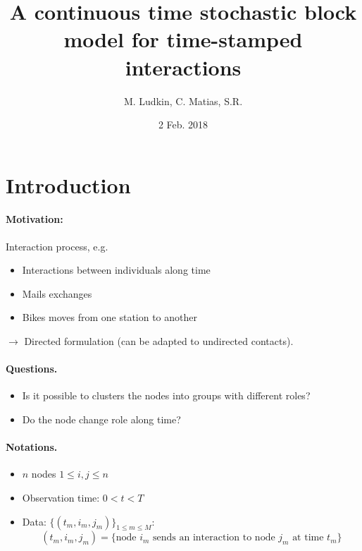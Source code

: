 \documentclass[a4paper, 12pt]{article}
\newcommand{\ra}{$\rightarrow$\xspace}
\begin{document}
\title{A continuous time stochastic block model for time-stamped interactions}
\author{M. Ludkin, C. Matias, S.R.} 
\date{2 Feb. 2018}
\maketitle

\section{Introduction}

\paragraph{Motivation:} Interaction process, e.g.
\begin{itemize}
 \item Interactions between individuals along time
 \item Mails exchanges
 \item Bikes moves from one station to another
\end{itemize}
\ra Directed formulation (can be adapted to undirected contacts).

\paragraph{Questions.}
\begin{itemize}
 \item Is it possible to clusters the nodes into groups with different roles?
 \item Do the node change role along time?
\end{itemize}

\nocite{MaM16}

\paragraph{Notations.}
\begin{itemize}
 \item $n$ nodes $1 \leq i ,j \leq n$
 \item Observation time: $0 < t < T$
 \item Data: $\{(t_m, i_m, j_m)\}_{1 \leq m \leq M}$:
  $$
  (t_m, i_m, j_m) = \{\text{node $i_m$ sends an interaction to node $j_m$ at time $t_m$}\}
  $$
\end{itemize}
\end{document}
